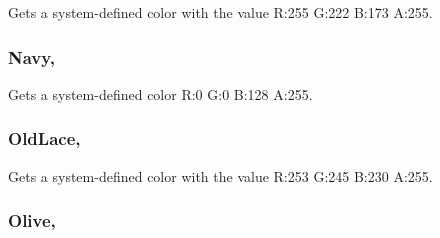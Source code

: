 Gets a system-\/defined color with the value R\+:255 G\+:222 B\+:173 A\+:255.

\hypertarget{structMicrosoft_1_1Xna_1_1Framework_1_1Color_a336d4fbe59ef1896b8e941ade97a009e}{}
\subsubsection[{Navy}]{ Navy\hspace{0.3cm}{\ttfamily [static]}, {\ttfamily [get]}}\label{structMicrosoft_1_1Xna_1_1Framework_1_1Color_a336d4fbe59ef1896b8e941ade97a009e}


Gets a system-\/defined color R\+:0 G\+:0 B\+:128 A\+:255.

\hypertarget{structMicrosoft_1_1Xna_1_1Framework_1_1Color_a6fa78cc65c7ea6c0d7ed6535976f6a3e}{}
\subsubsection[{Old\+Lace}]{ Old\+Lace\hspace{0.3cm}{\ttfamily [static]}, {\ttfamily [get]}}\label{structMicrosoft_1_1Xna_1_1Framework_1_1Color_a6fa78cc65c7ea6c0d7ed6535976f6a3e}


Gets a system-\/defined color with the value R\+:253 G\+:245 B\+:230 A\+:255.

\hypertarget{structMicrosoft_1_1Xna_1_1Framework_1_1Color_a20fa8b0eab53cc7fb93ec30c019624fe}{}
\subsubsection[{Olive}]{ Olive\hspace{0.3cm}{\ttfamily [static]}, {\ttfamily [get]}}\label{structMicrosoft_1_1Xna_1_1Framework_1_1Color_a20fa8b0eab53cc7fb93ec30c019624fe}



